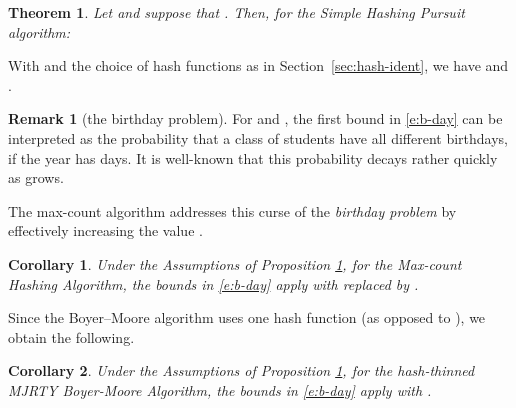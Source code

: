 \documentclass[10pt, conference, letterpaper,onecolumn]{IEEEtranv1.8}
\theoremstyle{plain}\newtheorem{thm}{Theorem}\newtheorem{lem}{Lemma}
\newtheorem{cor}{Corollary}
\theoremstyle{definition}
\newtheorem{rem}{Remark}
\def\HideProof#1{}
\begin{document}
\begin{thm} \label{p:simple} Let  and suppose that . Then, for the Simple Hashing Pursuit algorithm:

\end{thm}
 With  and the choice of hash functions as in Section~\ref{sec:hash-ident}, we have   and . 
\HideProof{\begin{proof}
For each hash function , let  be the event that the top- heavy hitters are hashed into  different bins,
{\em and} at the same time, the remaining  hitters are hashed into the remaining  bins. That is, the bins of
the top- hitters involve no collisions.  By the independence of , we have

If the event  occurs, then the top- heavy hitters will be correctly identified. Thus, the
independence of the events  in  implies that 

which by \eqref{e:b-day} yields the first bound. The second bound follows from 
the {\em product comparison} inequality

valid for all . Indeed, setting  and , we get

which gives the second bound.
\end{proof}}

\begin{rem}[the birthday problem] For  and , the first bound in \eqref{e:b-day} can be interpreted as
the probability that a class of  students have all different birthdays, if the year has
 days. It is well-known that this probability decays rather quickly as  grows.
\end{rem}
The max-count algorithm addresses this curse of the {\em birthday problem} by effectively increasing the value 
.

\begin{cor}
\label{cor:1}
 Under the Assumptions of Proposition \ref{p:simple}, for the Max-count Hashing Algorithm,
the bounds in \eqref{e:b-day} apply with  replaced by .
\end{cor}
\HideProof{\begin{proof}
The result follows by observing that hash-thinning with an independent uniform 
hash function  taking  values leads to  bins in \eqref{e:simple-1}.  
\end{proof}}

Since the Boyer--Moore algorithm uses one hash function (as opposed to ), 
we obtain the following.

\begin{cor}  Under the Assumptions of Proposition \ref{p:simple}, for the hash-thinned MJRTY Boyer-Moore
Algorithm, the bounds in \eqref{e:b-day} apply with .
\end{cor}
\end{document}
